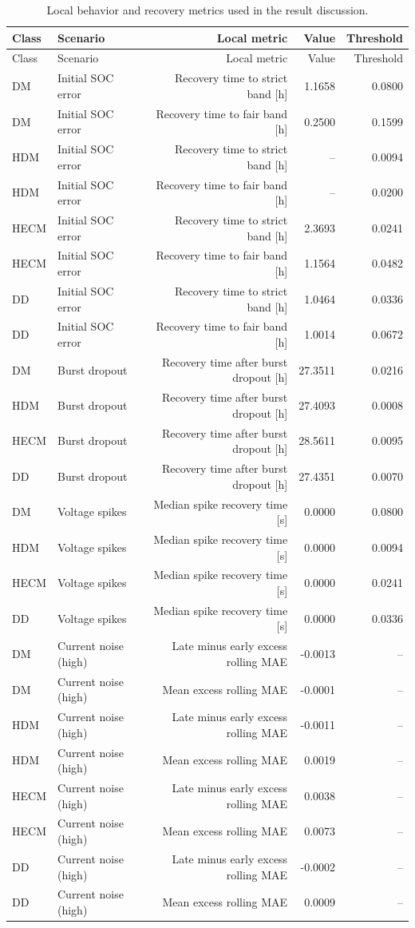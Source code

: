 \documentclass[review,nopreprintline]{elsarticle}
\begin{document}
\begin{longtable}{llrrr}
\caption{Local behavior and recovery metrics used in the result discussion.}\label{tab:appendix_local_metrics}\\
\toprule
Class & Scenario & Local metric & Value & Threshold \\
\midrule
\endfirsthead
\toprule
Class & Scenario & Local metric & Value & Threshold \\
\midrule
\endhead
DM & Initial SOC error & Recovery time to strict band [h] & 1.1658 & 0.0800 \\
DM & Initial SOC error & Recovery time to fair band [h] & 0.2500 & 0.1599 \\
HDM & Initial SOC error & Recovery time to strict band [h] & -- & 0.0094 \\
HDM & Initial SOC error & Recovery time to fair band [h] & -- & 0.0200 \\
HECM & Initial SOC error & Recovery time to strict band [h] & 2.3693 & 0.0241 \\
HECM & Initial SOC error & Recovery time to fair band [h] & 1.1564 & 0.0482 \\
DD & Initial SOC error & Recovery time to strict band [h] & 1.0464 & 0.0336 \\
DD & Initial SOC error & Recovery time to fair band [h] & 1.0014 & 0.0672 \\
DM & Burst dropout & Recovery time after burst dropout [h] & 27.3511 & 0.0216 \\
HDM & Burst dropout & Recovery time after burst dropout [h] & 27.4093 & 0.0008 \\
HECM & Burst dropout & Recovery time after burst dropout [h] & 28.5611 & 0.0095 \\
DD & Burst dropout & Recovery time after burst dropout [h] & 27.4351 & 0.0070 \\
DM & Voltage spikes & Median spike recovery time [s] & 0.0000 & 0.0800 \\
HDM & Voltage spikes & Median spike recovery time [s] & 0.0000 & 0.0094 \\
HECM & Voltage spikes & Median spike recovery time [s] & 0.0000 & 0.0241 \\
DD & Voltage spikes & Median spike recovery time [s] & 0.0000 & 0.0336 \\
DM & Current noise (high) & Late minus early excess rolling MAE & -0.0013 & -- \\
DM & Current noise (high) & Mean excess rolling MAE & -0.0001 & -- \\
HDM & Current noise (high) & Late minus early excess rolling MAE & -0.0011 & -- \\
HDM & Current noise (high) & Mean excess rolling MAE & 0.0019 & -- \\
HECM & Current noise (high) & Late minus early excess rolling MAE & 0.0038 & -- \\
HECM & Current noise (high) & Mean excess rolling MAE & 0.0073 & -- \\
DD & Current noise (high) & Late minus early excess rolling MAE & -0.0002 & -- \\
DD & Current noise (high) & Mean excess rolling MAE & 0.0009 & -- \\
\bottomrule
\end{longtable}
\end{document}
